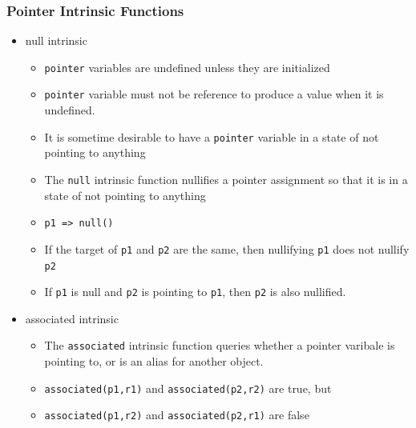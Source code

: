 \documentclass[c,mathserif,compress,xcolor=svgnames]{beamer}
\newcommand{\lstfortran}[1]{\lstinline[language={[90]Fortran},basicstyle=\footnotesize\ttfamily]|#1|}
\begin{document}
\begin{frame}
  \frametitle{\small Pointer Intrinsic Functions}
  \begin{itemize}
    \item null intrinsic
    \begin{itemize}
      \item \lstfortran{pointer} variables are undefined unless they are initialized
      \item \lstfortran{pointer} variable must not be reference to produce a value when it is undefined.
      \item It is sometime desirable to have a \lstfortran{pointer} variable in a state of not pointing to anything
      \item The \lstfortran{null} intrinsic function nullifies a pointer assignment so that it is in a state of not pointing to anything
      \item[] \lstfortran{p1 => null()}
      \item If the target of \lstfortran{p1} and \lstfortran{p2} are the same, then nullifying \lstfortran{p1} does not nullify \lstfortran{p2}
      \item If \lstfortran{p1} is null and \lstfortran{p2} is pointing to \lstfortran{p1}, then \lstfortran{p2} is also nullified.
    \end{itemize}
    \item associated intrinsic
    \begin{itemize}
      \item The \lstfortran{associated} intrinsic function queries whether a pointer varibale is pointing to, or is an alias for another object.
      \item[] \lstfortran{associated(p1,r1)} and \lstfortran{associated(p2,r2)} are true, but
      \item[] \lstfortran{associated(p1,r2)} and \lstfortran{associated(p2,r1)} are false
    \end{itemize}
  \end{itemize}
\end{frame}
\end{document}
